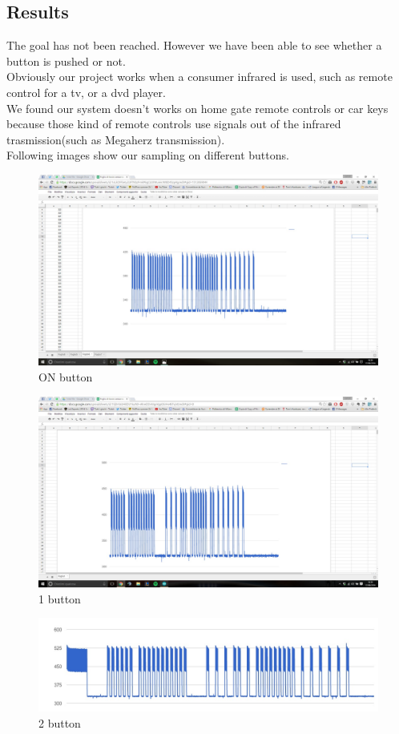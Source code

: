\subsection{Results}

The goal has not been reached. However we have been able to see whether a button is pushed or not.\\
Obviously our project works when a consumer infrared is used, such as remote control for a tv, or a dvd player.\\
We found our system doesn't works on home gate remote controls or car keys because those kind of remote controls use signals out of the infrared trasmission(such as Megaherz transmission).\\
Following images show our sampling on different buttons.

\begin{figure}[h]
	\centering
	\includegraphics[scale=0.3]{graphs/onButton_2.jpg}%
	\caption{ON button}

\end{figure}

\begin{figure}[h]
	\centering
	\includegraphics[scale=0.3]{graphs/1Button.jpg}%
	\caption{1 button}
		
\end{figure}

\begin{figure}[h]
	\centering
	\includegraphics[scale=0.3]{graphs/2Button.jpg}%
	\caption{2 button}
	
\end{figure}
